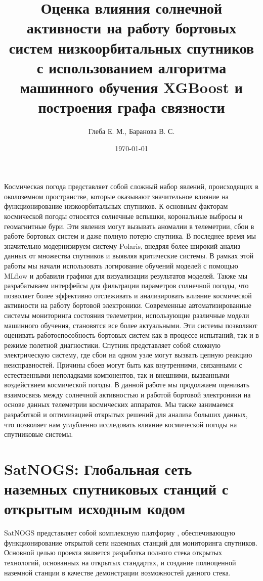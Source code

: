 \documentclass[14pt, a4paper]{bsu}
\title{Оценка влияния солнечной
активности на работу бортовых
систем низкоорбитальных
спутников с использованием
алгоритма машинного обучения
XGBoost и построения графа
связности}
\author{Глеба Е. М., Баранова В. С.}
\date{\today}
\begin{document}

Космическая погода представляет собой сложный набор явлений, происходящих в
околоземном пространстве, которые оказывают значительное влияние на
функционирование низкоорбитальных спутников. К основным факторам космической
погоды относятся солнечные вспышки, корональные выбросы и геомагнитные бури.
Эти явления могут вызывать аномалии в телеметрии, сбои в работе бортовых систем
и даже полную потерю спутника. В последнее время мы значительно модернизируем
систему Polaris, внедряя более широкий анализ данных от множества спутников и
выявляя критические системы. В рамках этой работы мы начали использовать
логирование обучений моделей с помощью MLflow и добавили графики для
визуализации результатов моделей. Также мы разрабатываем интерфейсы для
фильтрации параметров солнечной погоды, что позволяет более эффективно
отслеживать и анализировать влияние космической активности на работу бортовой
электроники. Современные автоматизированные системы мониторинга состояния
телеметрии, использующие различные модели машинного обучения, становятся все
более актуальными. Эти системы позволяют оценивать работоспособность бортовых
систем как в процессе испытаний, так и в режиме полетной диагностики. Спутник
представляет собой сложную электрическую систему, где сбои на одном узле могут
вызвать цепную реакцию неисправностей. Причины сбоев могут быть как
внутренними, связанными с естественными неполадками компонентов, так и
внешними, вызванными воздействием космической погоды. В данной работе мы
продолжаем оценивать взаимосвязь между солнечной активностью и работой бортовой
электроники на основе данных телеметрии космических аппаратов. Мы также
занимаемся разработкой и оптимизацией открытых решений для анализа больших
данных, что позволяет нам углубленно исследовать влияние космической погоды на
спутниковые системы.

\newpage

\chapter{SatNOGS: Глобальная сеть наземных спутниковых станций с открытым исходным кодом}



SatNOGS представляет собой комплексную платформу \cite{satnogs_general_docs},
обеспечивающую функционирование открытой сети наземных станций для мониторинга
спутников. Основной целью проекта является разработка полного стека открытых
технологий, основанных на открытых стандартах, и создание полноценной наземной
станции в качестве демонстрации возможностей данного стека.
\end{document}

